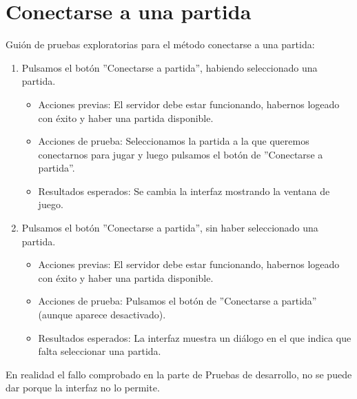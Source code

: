 \section{Conectarse a una partida}

Guión de pruebas exploratorias para el método conectarse a una partida:

\begin{enumerate}
\item Pulsamos el botón ''Conectarse a partida'', habiendo seleccionado una partida.
	\begin{itemize}
	\item Acciones previas: El servidor debe estar funcionando, habernos logeado con éxito y haber una partida disponible.
	\item Acciones de prueba: Seleccionamos la partida a la que queremos conectarnos para jugar y luego pulsamos el botón de ''Conectarse a partida''.
	\item Resultados esperados: Se cambia la interfaz mostrando la ventana de juego.
	\end{itemize}
\item Pulsamos el botón ''Conectarse a partida'', sin haber seleccionado una partida.
	\begin{itemize}
	\item Acciones previas: El servidor debe estar funcionando, habernos logeado con éxito y haber una partida disponible.
	\item Acciones de prueba: Pulsamos el botón de ''Conectarse a partida'' (aunque aparece desactivado).
	\item Resultados esperados: La interfaz muestra un diálogo en el que indica que falta seleccionar una partida.
	\end{itemize}
\end{enumerate}

En realidad el fallo comprobado en la parte de Pruebas de desarrollo, no se puede dar porque la interfaz no lo permite.
